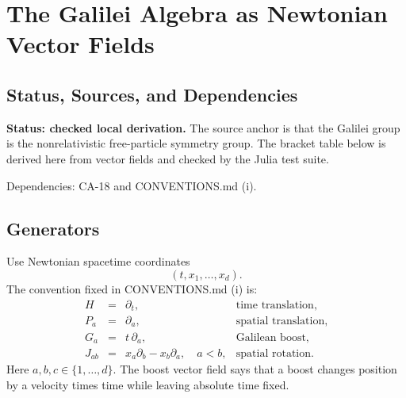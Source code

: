 
\section{The Galilei Algebra as Newtonian Vector Fields}
\label{sec:galilean-vector-field-algebra}

\subsection{Status, Sources, and Dependencies}

\textbf{Status: checked local derivation.}  The source anchor is that the
Galilei group is the nonrelativistic free-particle symmetry group.  The bracket
table below is derived here from vector fields and checked by the Julia test
suite.

Dependencies: CA-18 and CONVENTIONS.md (i).


\subsection{Generators}

Use Newtonian spacetime coordinates
\[
  (t,x_1,\ldots,x_d).
\]
The convention fixed in CONVENTIONS.md (i) is:
\[
\begin{array}{rcll}
  H   &=& \partial_t, &\text{time translation},\\
  P_a &=& \partial_a, &\text{spatial translation},\\
  G_a &=& t\,\partial_a, &\text{Galilean boost},\\
  J_{ab} &=& x_a\partial_b-x_b\partial_a,\quad a<b,
       &\text{spatial rotation}.
\end{array}
\]
Here \(a,b,c\in\{1,\ldots,d\}\).  The boost vector field says that a boost
changes position by a velocity times time while leaving absolute time fixed.

